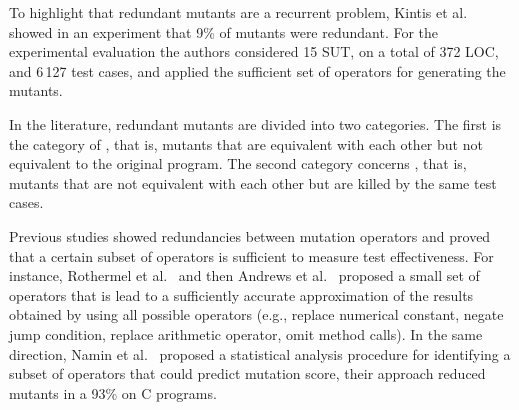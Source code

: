 
To highlight that redundant mutants are a recurrent problem, Kintis et al.~\cite{kintis2010evaluating} showed in an experiment that 9\% of mutants were redundant. For the experimental evaluation the authors considered 15 SUT, on a total of 372 LOC, and 6\,127 test cases, and applied the sufficient set of operators for generating the mutants. 


In the literature, redundant mutants are divided into two categories. The first is the category of , that is, mutants that are equivalent with each other but not equivalent to the original program. The second category concerns , that is, mutants that are not equivalent with each other but are killed by the same test cases. 

Previous studies showed redundancies between mutation operators and proved that a certain subset of operators is sufficient to measure test effectiveness. For instance, Rothermel et al.~\cite{rothermel1996experimental} and then Andrews et al.~\cite{andrews2005mutation} proposed a small set of operators that is lead to a sufficiently accurate approximation of the results obtained by using all possible operators (e.g., replace numerical constant, negate jump condition, replace arithmetic operator, omit method calls). In the same direction, Namin et al.~\cite{siami2008sufficient} proposed a statistical analysis procedure for identifying a subset of operators that could predict mutation score, their approach reduced mutants in a 93\% on C programs. 

